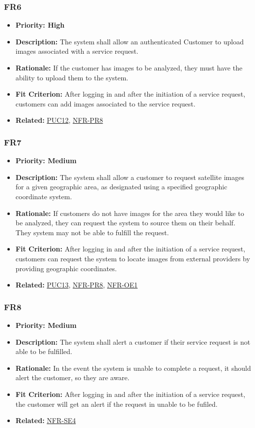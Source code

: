 \documentclass[12pt]{article}
\begin{document}
\subsubsection*{FR6}
\label{sec:FR6}
\begin{itemize}
  \item \textbf{Priority: High}
  \item \textbf{Description:} The system shall allow an authenticated Customer to upload images associated with a service request.
  \item \textbf{Rationale:} If the customer has images to be analyzed, they must have the ability to upload them to the system.
  \item \textbf{Fit Criterion:} After logging in and after the initiation of a service request, customers can add images associated to the service request.
  \item \textbf{Related:} \hyperref[sec:PUC12]{PUC12}, \hyperref[sec:PR8]{NFR-PR8}
\end{itemize}
\subsubsection*{FR7}
\label{sec:FR7}
\begin{itemize}
  \item \textbf{Priority: Medium}
  \item \textbf{Description:} The system shall allow a customer to request satellite images for a given geographic area, as designated using a specified geographic coordinate system.
  \item \textbf{Rationale:} If customers do not have images for the area they would like to be analyzed, they can request the system to source them on their behalf. They system may not be able to fulfill the request.
  \item \textbf{Fit Criterion:} After logging in and after the initiation of a service request, customers can request the system to locate images from external providers by providing geographic coordinates.
  \item \textbf{Related:} \hyperref[sec:PUC13]{PUC13}, \hyperref[sec:PR8]{NFR-PR8}, \hyperref[sec:OE1]{NFR-OE1}
\end{itemize}
\subsubsection*{FR8}
\label{sec:FR8}
\begin{itemize}
  \item \textbf{Priority: Medium}
  \item \textbf{Description:} The system shall alert a customer if their service request is not able to be fulfilled.
  \item \textbf{Rationale:} In the event the system is unable to complete a request, it should alert the customer, so they are aware.
  \item \textbf{Fit Criterion:} After logging in and after the initiation of a service request, the customer will get an alert if the request in unable to be fufiled.
  \item \textbf{Related:} \hyperref[sec:SE4]{NFR-SE4}
\end{itemize}
\end{document}
